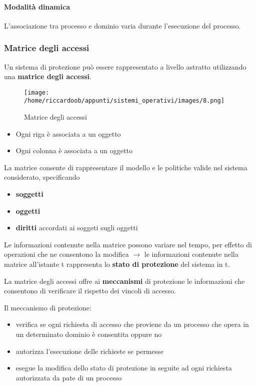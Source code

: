 \paragraph{Modalità dinamica}
L'associazione tra processo e dominio varia durante l'esecuzione del processo.

\subsubsection{Matrice degli accessi}

Un sistema di protezione può essere rappresentato a livello astratto utilizzando una \textbf{matrice degli accessi}.

\begin{figure}[H]
	\caption{Matrice degli accessi}
	\centering
	\texttt{[image: /home/riccardoob/appunti/sistemi\_operativi/images/8.png]}
\end{figure}
\begin{itemize}
	\item Ogni riga è associata a un oggetto
	\item Ogni colonna è associata a un oggetto
\end{itemize}

La matrice consente di rappresentare il modello e le politiche valide nel sistema considerato, specificando
\begin{itemize}
    \item \textbf{soggetti}
    \item \textbf{oggetti}
    \item \textbf{diritti} accordati ai soggeti sugli oggetti
\end{itemize}

Le informazioni contenute nella matrice possono variare nel tempo, per effetto di operazioni che ne consentono la modifica $\rightarrow$ le informazioni contenute nella matrice all'istante t rappresenta lo \textbf{stato di protezione} del sistema in t.

La matrice degli accessi offre ai \textbf{meccanismi} di protezione le informazioni che consentono di verificare il rispetto dei vincoli di accesso.

Il meccanismo di protezione:
\begin{itemize}
    \item verifica se ogni richiesta di accesso che proviene da un processo che opera in un determinato dominio è consentita oppure no
    \item autorizza l'esecuzione delle richieste se permesse
    \item esegue la modifica dello stato di protezione in seguite ad ogni richiesta autorizzata da pate di un processo
\end{itemize}

